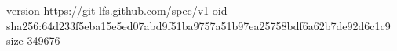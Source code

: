 version https://git-lfs.github.com/spec/v1
oid sha256:64d233f5eba15e5ed07abd9f51ba9757a51b97ea25758bdf6a62b7de92d6c1c9
size 349676

